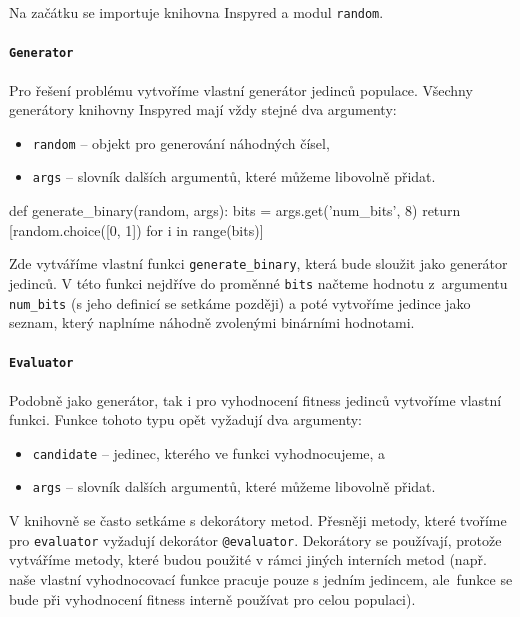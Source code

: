 Na začátku se importuje knihovna Inspyred a modul \texttt{random}.

\paragraph{\texttt{Generator}}
Pro řešení problému vytvoříme vlastní generátor jedinců populace. Všechny
generátory knihovny Inspyred mají vždy stejné dva argumenty:
\begin{itemize}
    \item \texttt{random} -- objekt pro generování náhodných čísel,
    \item \texttt{args} -- slovník dalších argumentů, které můžeme libovolně
        přidat.
\end{itemize}

\begin{code}
def generate_binary(random, args):
    bits = args.get('num_bits', 8)
    return [random.choice([0, 1]) for i in range(bits)]
\end{code}

Zde vytváříme vlastní funkci \texttt{generate\_binary}, která bude sloužit jako
generátor jedinců. V této funkci nejdříve do proměnné \texttt{bits} načteme
hodnotu z~argumentu \texttt{num\_bits} (s jeho definicí se setkáme později) a
poté vytvoříme jedince jako seznam, který naplníme náhodně zvolenými binárními
hodnotami.

\paragraph{\texttt{Evaluator}}
Podobně jako generátor, tak i pro vyhodnocení fitness jedinců vytvoříme vlastní
funkci. Funkce tohoto typu opět vyžadují dva argumenty:
\begin{itemize}
    \item \texttt{candidate} -- jedinec, kterého ve funkci vyhodnocujeme, a
    \item \texttt{args} -- slovník dalších argumentů, které můžeme libovolně
        přidat.
\end{itemize}

V knihovně se často setkáme s dekorátory metod. Přesněji metody, které tvoříme
pro \texttt{evaluator} vyžadují dekorátor \texttt{@evaluator}. Dekorátory se
používají, protože vytváříme metody, které budou použité v rámci jiných
interních metod (např. naše vlastní vyhodnocovací funkce pracuje pouze s
jedním jedincem, ale~funkce se bude při vyhodnocení fitness interně používat
pro celou populaci).

